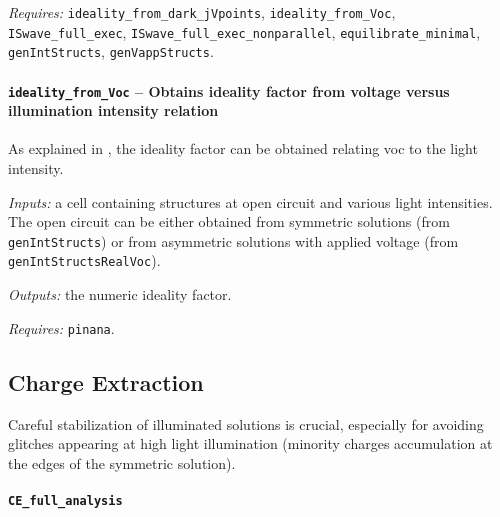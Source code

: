 \textit{Requires:} \texttt{ideality\_from\_dark\_jVpoints}, \texttt{ideality\_from\_Voc}, \texttt{ISwave\_full\_exec}, \texttt{ISwave\_full\_exec\_nonparallel}, \texttt{equilibrate\_minimal}, \texttt{gen\-Int\-Structs}, \texttt{gen\-Vapp\-Structs}.

			\paragraph{\texttt{ideality\_from\_Voc} -- Obtains ideality factor from voltage versus illumination intensity relation}\label{dd_ideality}
	As explained in , the ideality factor can be obtained relating \gls{voc} to the light intensity.
	
			\textit{Inputs:} a cell containing structures at open circuit and various
	     light intensities. The open circuit can be either obtained from
	     symmetric solutions (from \texttt{gen\-Int\-Structs}) or from asymmetric solutions
	     with applied voltage (from \texttt{gen\-Int\-Structs\-Real\-Voc}).
	
	\textit{Outputs:} the numeric ideality factor.
	
	\textit{Requires:} \texttt{pinana}.
	
	

	\subsection{Charge Extraction}
		Careful stabilization of illuminated solutions is crucial, especially for avoiding glitches appearing at high light illumination (minority charges accumulation at the edges of the symmetric solution).
		\paragraph{\texttt{CE\_full\_analysis}}
